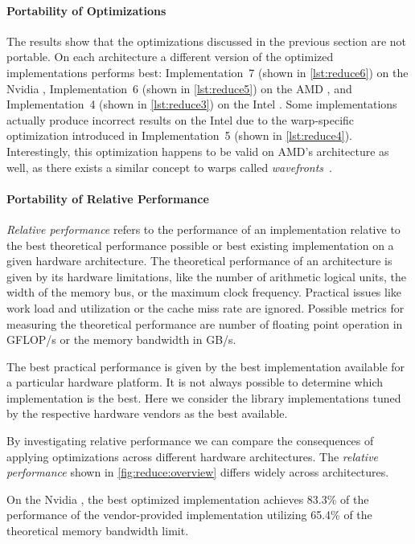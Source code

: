 \paragraph{Portability of Optimizations}
The results show that the optimizations discussed in the previous section are not portable.
On each architecture a different version of the optimized implementations performs best:
Implementation~7 (shown in \autoref{lst:reduce6}) on the Nvidia \GPU, Implementation~6 (shown in \autoref{lst:reduce5}) on the AMD \GPU, and Implementation~4 (shown in \autoref{lst:reduce3}) on the Intel \CPU.
Some implementations actually produce incorrect results on the Intel \CPU due to the warp-specific optimization introduced in Implementation~5 (shown in \autoref{lst:reduce4}).
Interestingly, this optimization happens to be valid on AMD's \GPU architecture as well, as there exists a similar concept to warps called \emph{wavefronts}~\cite{AMDGCN2012}.

\paragraph{Portability of Relative Performance}
\emph{Relative performance} refers to the performance of an implementation relative to the best theoretical performance possible or best existing implementation on a given hardware architecture.
The theoretical performance of an architecture is given by its hardware limitations, like the number of arithmetic logical units, the width of the memory bus, or the maximum clock frequency.
Practical issues like work load and utilization or the cache miss rate are ignored.
Possible metrics for measuring the theoretical performance are number of floating point operation in GFLOP/s or the memory bandwidth in GB/s.

The best practical performance is given by the best implementation available for a particular hardware platform.
It is not always possible to determine which implementation is the best.
Here we consider the \BLAS library implementations tuned by the respective hardware vendors as the best available.

By investigating relative performance we can compare the consequences of applying optimizations across different hardware architectures.
The \emph{relative performance} shown in \autoref{fig:reduce:overview} differs widely across architectures. %

On the Nvidia \GPU, the best optimized implementation achieves 83.3\% of the performance of the vendor-provided \CUBLAS implementation utilizing 65.4\% of the theoretical memory bandwidth limit.

